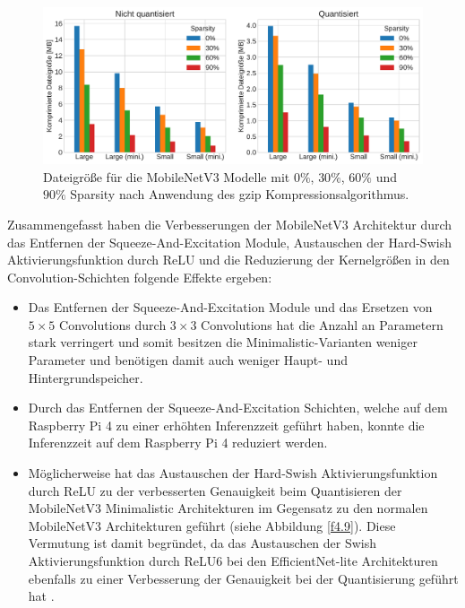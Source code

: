 \begin{figure}[htbp]
\centerline{\includegraphics[width=\textwidth]{content/images/pruned_and_compressed_mnv3mini.pdf}}
\caption{Dateigröße für die MobileNetV3 Modelle mit $0\%$, $30\%$, $60\%$ und $90\%$ Sparsity nach Anwendung des gzip Kompressionsalgorithmus.}
\label{f4.11}
\end{figure}

Zusammengefasst haben die Verbesserungen der MobileNetV3 Architektur durch das Entfernen der Squeeze-And-Excitation Module, Austauschen der Hard-Swish Aktivierungsfunktion durch ReLU und die Reduzierung der Kernelgrößen in den Convolution-Schichten folgende Effekte ergeben:
\begin{itemize}
\item Das Entfernen der Squeeze-And-Excitation Module und das Ersetzen von $5 \times 5$ Convolutions durch $3 \times 3$ Convolutions hat die Anzahl an Parametern stark verringert und somit besitzen die Minimalistic-Varianten weniger Parameter und benötigen damit auch weniger Haupt- und Hintergrundspeicher.
\item Durch das Entfernen der Squeeze-And-Excitation Schichten, welche auf dem Rasp\-berry Pi 4 zu einer erhöhten Inferenzzeit geführt haben, konnte die Inferenzzeit auf dem Raspberry Pi 4 reduziert werden.
\item Möglicherweise hat das Austauschen der Hard-Swish Aktivierungsfunktion durch ReLU zu der verbesserten Genauigkeit beim Quantisieren der MobileNetV3 Minimalistic Architekturen im Gegensatz zu den normalen MobileNetV3 Architekturen geführt (siehe Abbildung \ref{f4.9}). Diese Vermutung ist damit begründet, da das Austauschen der Swish Aktivierungsfunktion durch ReLU6 bei den EfficientNet-lite Architekturen ebenfalls zu einer Verbesserung der Genauigkeit bei der Quantisierung geführt hat \cite{liu_higher_2020}.
\end{itemize}



